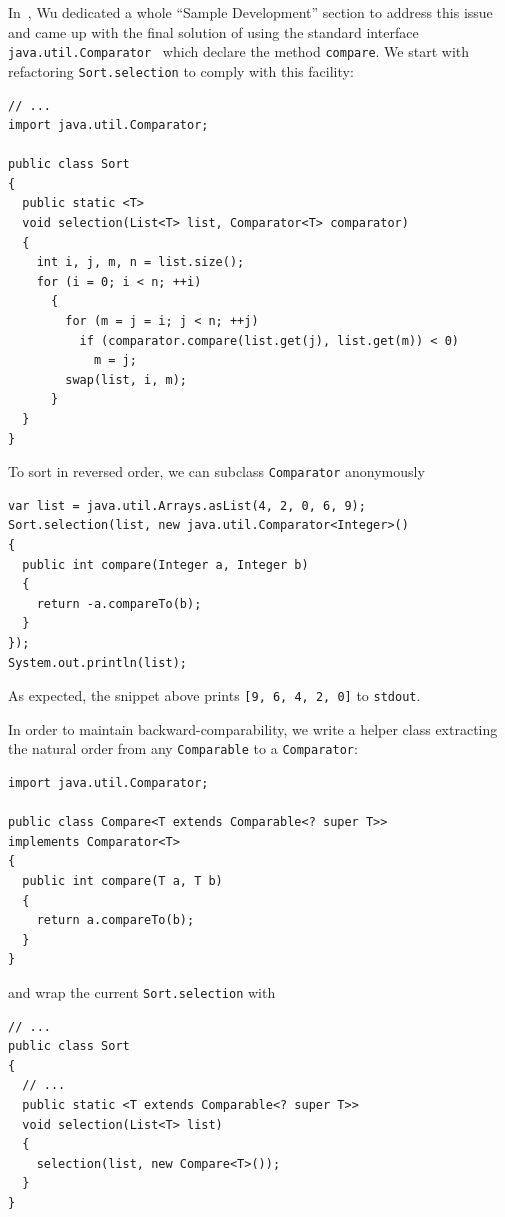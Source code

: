 \documentclass[a4paper,12pt]{article}
\begin{document}
In~\cite{wu}, Wu dedicated a whole ``Sample Development'' section to address
this issue and came up with the final solution of using the standard interface
\verb|java.util.Comparator|~\cite{cmp} which declare the method \verb|compare|.
We start with refactoring \verb|Sort.selection| to comply with this facility:
\begin{verbatim}
// ...
import java.util.Comparator;

public class Sort
{
  public static <T>
  void selection(List<T> list, Comparator<T> comparator)
  {
    int i, j, m, n = list.size();
    for (i = 0; i < n; ++i)
      {
        for (m = j = i; j < n; ++j)
          if (comparator.compare(list.get(j), list.get(m)) < 0)
            m = j;
        swap(list, i, m);
      }
  }
}
\end{verbatim}

To sort in reversed order, we can subclass \verb|Comparator|
anonymously~\cite{anon}
\begin{verbatim}
var list = java.util.Arrays.asList(4, 2, 0, 6, 9);
Sort.selection(list, new java.util.Comparator<Integer>()
{
  public int compare(Integer a, Integer b)
  {
    return -a.compareTo(b);
  }
});
System.out.println(list);
\end{verbatim}

As expected, the snippet above prints \verb|[9, 6, 4, 2, 0]| to \verb|stdout|.

In order to maintain backward-comparability, we write a helper class extracting
the natural order from any \verb|Comparable| to a \verb|Comparator|:
\begin{verbatim}
import java.util.Comparator;

public class Compare<T extends Comparable<? super T>>
implements Comparator<T>
{
  public int compare(T a, T b)
  {
    return a.compareTo(b);
  }
}
\end{verbatim}
and wrap the current \verb|Sort.selection| with
\begin{verbatim}
// ...
public class Sort
{
  // ...
  public static <T extends Comparable<? super T>>
  void selection(List<T> list)
  {
    selection(list, new Compare<T>());
  }
}
\end{verbatim}
\end{document}
